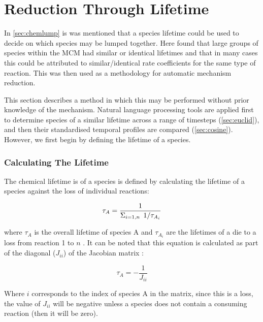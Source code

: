   \section{Reduction Through Lifetime}\label{sec:lifetime}
  In \autoref{sec:chemlump} is was mentioned that a species lifetime could be used to decide on which species may be lumped together. Here \cite{lifetime} found that large groups of species within the MCM had similar or identical lifetimes and that in many cases this could be attributed to similar/identical rate coefficients for the same type of reaction. This was then used as a methodology for automatic mechanism reduction.

  This section describes a method in which this may be performed without prior knowledge of the mechanism. Natural language processing tools are applied first to determine species of a similar lifetime across a range of timesteps (\autoref{sec:euclid}), and then their standardised temporal profiles are compared (\autoref{sec:cosine}). However, we first begin by defining the lifetime of a species.

  \subsubsection{Calculating The Lifetime}
  The chemical lifetime is of a species is defined by calculating the lifetime of a species against the loss of individual reactions:





    \begin{equation}
    \tau_A = \frac{1}{\Large{\Sigma}_{i=1,n}\  {1}/{\tau_{A_i}}}
    \end{equation}

where $\tau_A$ is the overall lifetime of species A and $\tau_{A_i}$ are the lifetimes of a die to a loss from reaction 1 to $n$ \citep{fundamentals}. It can be noted that this equation is calculated as part of the diagonal ($J_{ii}$) of the Jacobian matrix \citep{kinetics,lifetime}:


  \begin{equation}
  \tau_A = - \frac{1}{J_{ii}}
  \end{equation}

Where $i$ corresponds to the index of species A in the matrix, since this is a loss, the value of $J_{ii}$ will be negative unless a species does not contain a consuming reaction (then it will be zero).

